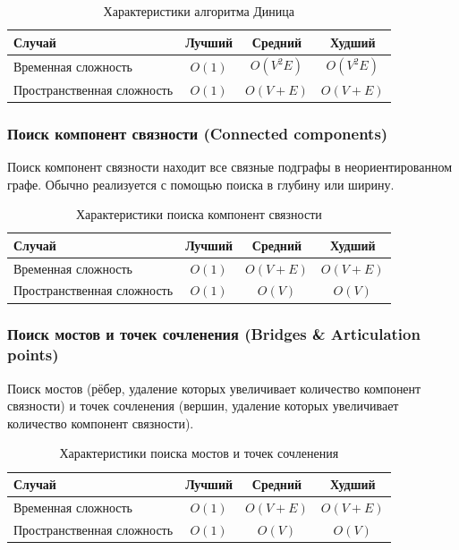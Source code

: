 \documentclass[a4paper,12pt]{article}
\begin{document}
\begin{table}[H]
    \centering
    \begin{tabular}{|l|c|c|c|}
        \hline
        Случай & Лучший & Средний & Худший \\
        \hline
        Временная сложность & $O(1)$ & $O(V^2E)$ & $O(V^2E)$ \\
        \hline
        Пространственная сложность & $O(1)$ & $O(V + E)$ & $O(V + E)$ \\
        \hline
    \end{tabular}
    \caption{Характеристики алгоритма Диница}
\end{table}

\subsubsection{Поиск компонент связности (Connected components)}
\label{subsubsec:поиск-компонент-связности-connected-components}

Поиск компонент связности находит все связные подграфы в неориентированном графе. Обычно реализуется с помощью поиска в глубину или ширину.

\begin{table}[H]
    \centering
    \begin{tabular}{|l|c|c|c|}
        \hline
        Случай & Лучший & Средний & Худший \\
        \hline
        Временная сложность & $O(1)$ & $O(V + E)$ & $O(V + E)$ \\
        \hline
        Пространственная сложность & $O(1)$ & $O(V)$ & $O(V)$ \\
        \hline
    \end{tabular}
    \caption{Характеристики поиска компонент связности}
\end{table}

\subsubsection{Поиск мостов и точек сочленения (Bridges \& Articulation points)}
\label{subsubsec:поиск-мостов-и-точек-сочленения-bridges-articulation-points}

Поиск мостов (рёбер, удаление которых увеличивает количество компонент связности) и точек сочленения (вершин, удаление которых увеличивает количество компонент связности).

\begin{table}[H]
    \centering
    \begin{tabular}{|l|c|c|c|}
        \hline
        Случай & Лучший & Средний & Худший \\
        \hline
        Временная сложность & $O(1)$ & $O(V + E)$ & $O(V + E)$ \\
        \hline
        Пространственная сложность & $O(1)$ & $O(V)$ & $O(V)$ \\
        \hline
    \end{tabular}
    \caption{Характеристики поиска мостов и точек сочленения}
\end{table}
\end{document}
